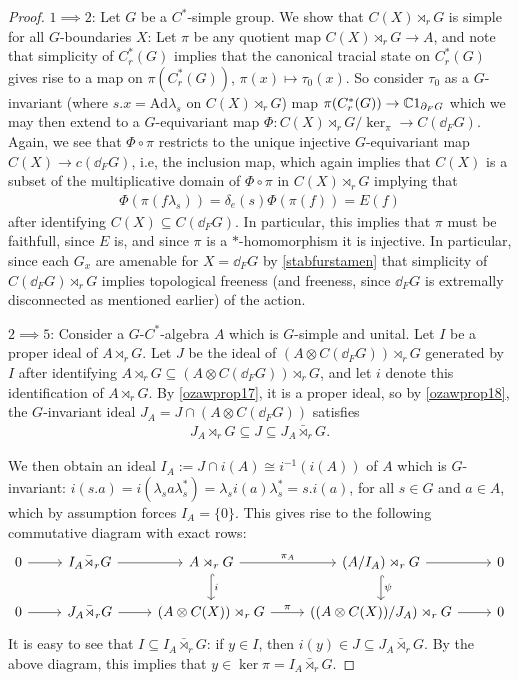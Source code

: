 \begin{proof}
	$1 \implies 2$: Let $G$ be a $C^*$-simple group. We show that $C(X) \rtimes_r G$ is simple for all $G$-boundaries $X$: Let $\pi$ be any quotient map $C(X) \rtimes_r G \to A$, and note that simplicity of $C_r^*(G)$ implies that the canonical tracial state on $C_r^*(G)$ gives rise to a map on $\pi(C_r^*(G))$, $\pi(x) \mapsto \tau_0(x)$. So consider $\tau_0$ as a $G$-invariant (where $s.x = \mathrm{Ad} \lambda_s$ on $C(X) \rtimes_r G$) map $ \pi(C_r^*(G)) \to \mathbb{C} 1_{\partial_F G}$ which we may then extend to a $G$-equivariant map $\Phi \colon C(X) \rtimes_r G/\ker_\pi \to C(\dd_F G)$. Again, we see that $\Phi \circ \pi$ restricts to the unique injective $G$-equivariant map $C(X) \to c(\dd_F G)$, i.e, the inclusion map, which again implies that $C(X)$ is a subset of the multiplicative domain of $\Phi \circ \pi$ in $C(X) \rtimes_r G$ implying that
	\begin{align*}
		\Phi (\pi(f \lambda_s)) = \delta_{e}(s) \Phi(\pi(f)) = E(f)	
	\end{align*}
	after identifying $C(X) \subseteq C(\dd_F G)$. In particular, this implies that $\pi$ must be faithfull, since $E$ is, and since $\pi$ is a $*$-homomorphism it is injective. In particular, since each $G_x$ are amenable for $X= \dd_F G$ by \cref{stabfurstamen} that simplicity of $C( \dd_F G) \rtimes_r G$ implies topological freeness (and freeness, since $\dd_F G$ is extremally disconnected as mentioned earlier) of the action.

	$2 \implies 5$: Consider a $G$-$C^*$-algebra $A$ which is $G$-simple and unital. Let $I$ be a proper ideal of $A \rtimes_r G$. Let $J$ be the ideal of $(A \otimes C(\dd_F G)) \rtimes_r G$ generated by $I$ after identifying $A \rtimes_r G \subseteq (A \otimes C(\dd_F G) ) \rtimes_r G$, and let $i$ denote this identification of $A \rtimes_r G$. By \cref{ozawprop17}, it is a proper ideal, so by \cref{ozawprop18}, the $G$-invariant ideal $J_A = J \cap (A \otimes C(\dd_F G))$ satisfies
	\begin{align*}
		J_A \rtimes_r G \subseteq J \subseteq J_A \bar \rtimes_r G.
	\end{align*}

	We then obtain an ideal $I_A := J \cap i(A) \cong i^{-1}(i(A))$ of $A$ which is $G$-invariant: $i(s.a) = i(\lambda_s a \lambda_s^* ) = \lambda_s i(a) \lambda_s^* = s.i(a)$, for all $s \in G$ and $a \in A$, which by assumption forces $I_A = \{0\}$. This gives rise to the following commutative diagram with exact rows:
	\begin{equation*}
		\begin{tikzcd}
			0 \ar[r] &  I_A \bar \rtimes_r G  \ar[r] & A \rtimes_r G \ar[r, "\pi_A"] \ar[d, hook, "i"] & (A / I_A)\rtimes_r G  \ar[r] \ar[d, hook, "\psi"]  & 0\\
			0  \ar[r] & J_A \bar \rtimes_r G  \ar[r] & (A \otimes C(X)) \rtimes_r G \ar[r, "\pi"] & \left((A \otimes C(X))/J_A\right) \rtimes_r G \ar[r] & 0
		\end{tikzcd}
	\end{equation*}
	It is easy to see that $I \subseteq I_A \bar \rtimes_r G$: if $y \in I$, then $i(y) \in J \subseteq J_A \bar \rtimes_r G$. By the above diagram, this implies that $y \in \ker \pi = I_A \bar \rtimes_r G$. 
	

\end{proof}
